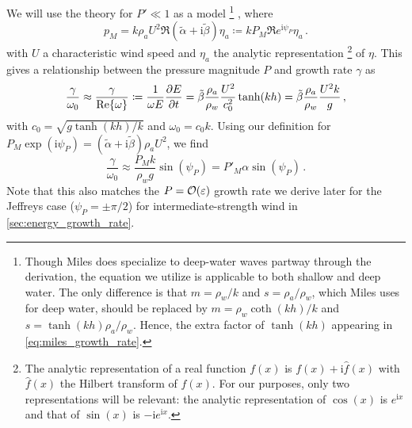 \documentclass{jfm}
\newcommand{\im}{\mathrm{i}}
\renewcommand*{\epsilon}{\varepsilon}
\begin{document}
We will use the \citet{miles1957generation} theory for $P' \ll 1$ as a model%
\footnote{
  Though Miles does specialize to deep-water waves partway through the
  derivation, the equation we utilize is applicable to both shallow and
  deep water.
  The only difference is that $m = \rho_w/k$ and $s=\rho_a/\rho_w$,
  which Miles uses for deep water, should be replaced by
  $m=\rho_w\coth(kh)/k$ and $s = \tanh(kh) \rho_a/\rho_w$.
  Hence, the extra factor of $\tanh(kh)$ appearing in
  \cref{eq:miles_growth_rate}.
}%
, where
\begin{equation}
  p_M = k \rho_a U^2 \Re{(\tilde{\alpha} + \im \tilde{\beta}) \eta_a}
  \coloneqq k P_M \Re{ e^{\im \psi_P} \eta_a} \,.
\end{equation}
with $U$ a characteristic wind speed and $\eta_a$ the analytic
representation%
\footnote{
  The analytic representation of a real function $f(x)$ is $f(x) + \im
  \hat{f}(x)$ with $\hat{f}(x)$ the Hilbert transform of $f(x)$.
  For our purposes, only two representations will be relevant: the
  analytic representation of $\cos(x)$ is $e^{\im x}$ and that of
  $\sin(x)$ is $-\im e^{\im x}$.
}
of $\eta$.
This gives a relationship between the pressure magnitude $P$ and growth
rate $\gamma$ as
\begin{equation}
  \frac{\gamma}{\omega_0} \approx \frac{\gamma}{\Re{\omega}} \coloneqq
  \frac{1}{\omega E} \pdv{E}{t}
  = \tilde{\beta} \frac{\rho_a}{\rho_w} \frac{U^2}{c_0^2} \tanh(kh)
  = \tilde{\beta} \frac{\rho_a}{\rho_w} \frac{U^2 k}{g} \,,
  \label{eq:miles_growth_rate}
\end{equation}
with $c_0 = \sqrt{g\tanh(kh)/k}$ and $\omega_0 = c_0 k$.
Using our definition for $P_M \exp(\im \psi_P) = (\tilde{\alpha} + \im
\tilde{\beta}) \rho_a U^2$, we find
\begin{equation}
  \frac{\gamma}{\omega_0} \approx \frac{P_M k}{\rho_w g} \sin(\psi_P)
  = P'_M \alpha \sin(\psi_P) \,.
\end{equation}
Note that this also matches the $P = \order{\epsilon}$ growth rate we
derive later for the Jeffreys case (\ie $\psi_P = \pm \pi/2$) for
intermediate-strength wind in \cref{sec:energy_growth_rate}.
\end{document}
